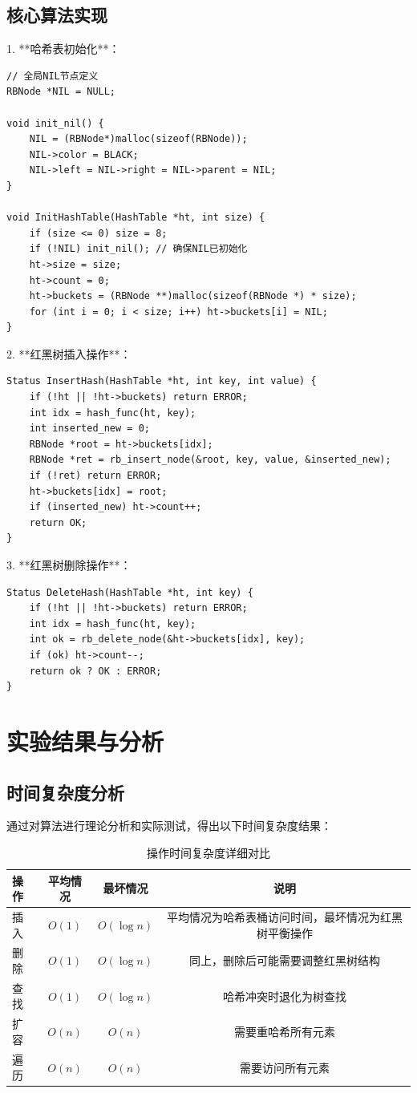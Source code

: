 \documentclass[12pt,a4paper]{article}
\begin{document}
\subsection{核心算法实现}
1. **哈希表初始化**：
\begin{lstlisting}
// 全局NIL节点定义
RBNode *NIL = NULL;

void init_nil() {
    NIL = (RBNode*)malloc(sizeof(RBNode));
    NIL->color = BLACK;
    NIL->left = NIL->right = NIL->parent = NIL;
}

void InitHashTable(HashTable *ht, int size) {
    if (size <= 0) size = 8;
    if (!NIL) init_nil(); // 确保NIL已初始化
    ht->size = size;
    ht->count = 0;
    ht->buckets = (RBNode **)malloc(sizeof(RBNode *) * size);
    for (int i = 0; i < size; i++) ht->buckets[i] = NIL;
}
\end{lstlisting}

2. **红黑树插入操作**：
\begin{lstlisting}
Status InsertHash(HashTable *ht, int key, int value) {
    if (!ht || !ht->buckets) return ERROR;
    int idx = hash_func(ht, key);
    int inserted_new = 0;
    RBNode *root = ht->buckets[idx];
    RBNode *ret = rb_insert_node(&root, key, value, &inserted_new);
    if (!ret) return ERROR;
    ht->buckets[idx] = root;
    if (inserted_new) ht->count++;
    return OK;
}
\end{lstlisting}

3. **红黑树删除操作**：
\begin{lstlisting}
Status DeleteHash(HashTable *ht, int key) {
    if (!ht || !ht->buckets) return ERROR;
    int idx = hash_func(ht, key);
    int ok = rb_delete_node(&ht->buckets[idx], key);
    if (ok) ht->count--;
    return ok ? OK : ERROR;
}
\end{lstlisting}

\section{实验结果与分析}

\subsection{时间复杂度分析}
通过对算法进行理论分析和实际测试，得出以下时间复杂度结果：

\begin{table}[h]
\centering
\caption{操作时间复杂度详细对比}
\begin{tabular}{|l|c|c|c|}
\hline
操作 & 平均情况 & 最坏情况 & 说明 \\
\hline
插入 & $O(1)$ & $O(\log n)$ & 平均情况为哈希表桶访问时间，最坏情况为红黑树平衡操作\\
删除 & $O(1)$ & $O(\log n)$ & 同上，删除后可能需要调整红黑树结构\\
查找 & $O(1)$ & $O(\log n)$ & 哈希冲突时退化为树查找\\
扩容 & $O(n)$ & $O(n)$ & 需要重哈希所有元素\\
遍历 & $O(n)$ & $O(n)$ & 需要访问所有元素\\
\hline
\end{tabular}
\end{table}
\end{document}
